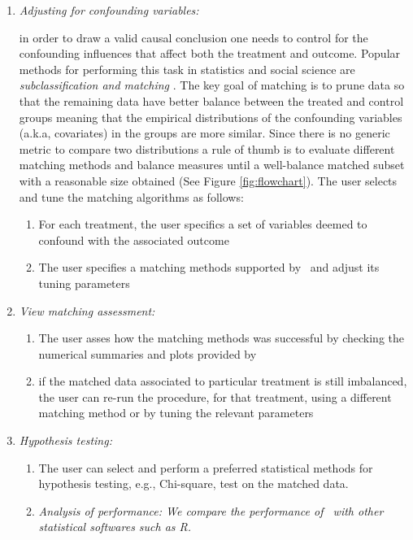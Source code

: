 \begin{enumerate}
  \item {\it Adjusting for confounding variables:} 
  
in order to draw a valid causal conclusion one needs to control for the
confounding influences that affect both the treatment and outcome. Popular methods for
performing this task in statistics and social science are {\em subclassification and matching} \cite{Rubin1983b,IacKinPor09,rosenbaum1984reducing}.
The key goal of matching is to prune data so that
the remaining data have better balance between the treated and control groups meaning that the empirical distributions of the confounding variables (a.k.a, covariates) in the groups are more similar.  Since there is no generic metric to compare
two distributions a rule of thumb is to evaluate different matching methods and balance measures  until a well-balance matched subset with
a reasonable size obtained \cite{IacKinPor09} (See Figure \ref{fig:flowchart}).  
  The user selects and tune the matching algorithms as follows:
     \begin{enumerate}
      \item For each treatment, the user specifics a set of variables deemed to confound with the associated outcome
      \item The user specifies a matching methods supported by \GSQL\ and adjust its tuning parameters
\end{enumerate}

  \item {\it View matching assessment:}
    \begin{enumerate}
      \item The user asses how the matching methods was successful by checking the numerical summaries and plots provided by \GSQL
      \item
      if the matched data associated to  particular treatment is still imbalanced, the user can re-run the procedure, for that treatment,
        using a different matching method or by tuning the relevant parameters
    \end{enumerate}
  \item {\it Hypothesis testing:}
    \begin{enumerate}
      \item The user can select and perform a preferred statistical methods for hypothesis testing, e.g., Chi-square, test on the matched data.
    \item {\it Analysis of performance: We compare the performance of \GSQL\ with other statistical softwares such as R.}

    \end{enumerate}
\end{enumerate}



